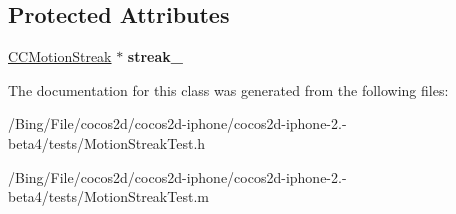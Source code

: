 \subsection*{Protected Attributes}
\begin{DoxyCompactItemize}
\item 
\hypertarget{interface_motion_streak_test_af124e4e2de867218cd1b6a49fb31a5f1}{\hyperlink{interface_c_c_motion_streak}{C\-C\-Motion\-Streak} $\ast$ {\bfseries streak\-\_\-}}\label{interface_motion_streak_test_af124e4e2de867218cd1b6a49fb31a5f1}

\end{DoxyCompactItemize}


The documentation for this class was generated from the following files\-:\begin{DoxyCompactItemize}
\item 
/\-Bing/\-File/cocos2d/cocos2d-\/iphone/cocos2d-\/iphone-\/2.-\/beta4/tests/Motion\-Streak\-Test.\-h\item 
/\-Bing/\-File/cocos2d/cocos2d-\/iphone/cocos2d-\/iphone-\/2.-\/beta4/tests/Motion\-Streak\-Test.\-m\end{DoxyCompactItemize}
